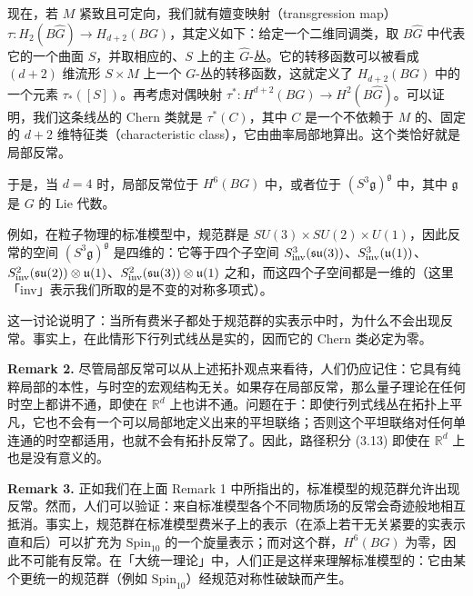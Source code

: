 现在，若 $M$ 紧致且可定向，我们就有嬗变映射（transgression map）$\tau:H_2(B\hat G)\to H_{d+2}(BG)$，其定义如下：给定一个二维同调类，取 $B\hat G$ 中代表它的一个曲面 $S$，并取相应的、$S$ 上的主 $\hat G$-丛。它的转移函数可以被看成 $(d+2)$ 维流形 $S\times M$ 上一个 $G$-丛的转移函数，这就定义了 $H_{d+2}(BG)$ 中的一个元素 $\tau_*([S])$。再考虑对偶映射 $\tau^{*}:H^{d+2}(BG)\to H^2(B\hat G)$。可以证明，我们这条线丛的 Chern 类就是 $\tau^{*}(C)$，其中 $C$ 是一个不依赖于 $M$ 的、固定的 $d+2$ 维特征类（characteristic class），它由曲率局部地算出。这个类恰好就是局部反常。


于是，当 $d=4$ 时，局部反常位于 $H^6(BG)$ 中，或者位于 $(S^3\mathfrak g)^{\mathfrak g}$ 中，其中 $\mathfrak g$ 是 $G$ 的 Lie 代数。

例如，在粒子物理的标准模型中，规范群是 $SU(3)\times SU(2)\times U(1)$，因此反常的空间 $(S^3\mathfrak g)^{\mathfrak g}$ 是四维的：它等于四个子空间 $S^3_{\rm inv}(\mathfrak{su}(3))$、$S^3_{\rm inv}(\mathfrak{u}(1))$、$S^2_{\rm inv}(\mathfrak{su}(2))\otimes\mathfrak{u}(1)$、$S^2_{\rm inv}(\mathfrak{su}(3))\otimes\mathfrak{u}(1)$ 之和，而这四个子空间都是一维的（这里「inv」表示我们所取的是不变的对称多项式）。

这一讨论说明了：当所有费米子都处于规范群的实表示中时，为什么不会出现反常。事实上，在此情形下行列式线丛是实的，因而它的 Chern 类必定为零。

\textbf{Remark 2.} 尽管局部反常可以从上述拓扑观点来看待，人们仍应记住：它具有纯粹局部的本性，与时空的宏观结构无关。如果存在局部反常，那么量子理论在任何时空上都讲不通，即使在 $\mathbb{R}^d$ 上也讲不通。问题在于：即使行列式线丛在拓扑上平凡，它也不会有一个可以局部地定义出来的平坦联络；否则这个平坦联络对任何单连通的时空都适用，也就不会有拓扑反常了。因此，路径积分 (3.13) 即使在 $\mathbb{R}^d$ 上也是没有意义的。

\textbf{Remark 3.} 正如我们在上面 Remark 1 中所指出的，标准模型的规范群允许出现反常。然而，人们可以验证：来自标准模型各个不同物质场的反常会奇迹般地相互抵消。事实上，规范群在标准模型费米子上的表示（在添上若干无关紧要的实表示直和后）可以扩充为 $\mathrm{Spin}_{10}$ 的一个旋量表示；而对这个群，$H^6(BG)$ 为零，因此不可能有反常。在「大统一理论」中，人们正是这样来理解标准模型的：它由某个更统一的规范群（例如 $\mathrm{Spin}_{10}$）经规范对称性破缺而产生。

